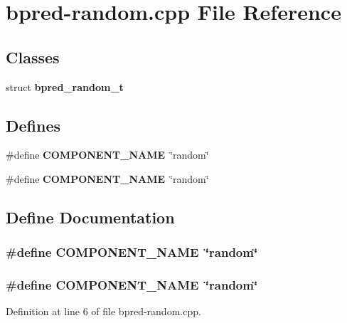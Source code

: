 \section{bpred-random.cpp File Reference}
\label{bpred-random_8cpp}
\subsection*{Classes}
\begin{CompactItemize}
\item 
struct {\bf bpred\_\-random\_\-t}
\end{CompactItemize}
\subsection*{Defines}
\begin{CompactItemize}
\item 
\#define {\bf COMPONENT\_\-NAME}~\char`\"{}random\char`\"{}
\item 
\#define {\bf COMPONENT\_\-NAME}~\char`\"{}random\char`\"{}
\end{CompactItemize}


\subsection{Define Documentation}
\subsubsection[{COMPONENT\_\-NAME}]{\setlength{\rightskip}{0pt plus 5cm}\#define COMPONENT\_\-NAME~\char`\"{}random\char`\"{}}\label{zesto-bpred_8cpp_9146ade7ce24e3db226a973a59063892}


\subsubsection[{COMPONENT\_\-NAME}]{\setlength{\rightskip}{0pt plus 5cm}\#define COMPONENT\_\-NAME~\char`\"{}random\char`\"{}}\label{bpred-random_8cpp_9146ade7ce24e3db226a973a59063892}




Definition at line 6 of file bpred-random.cpp.